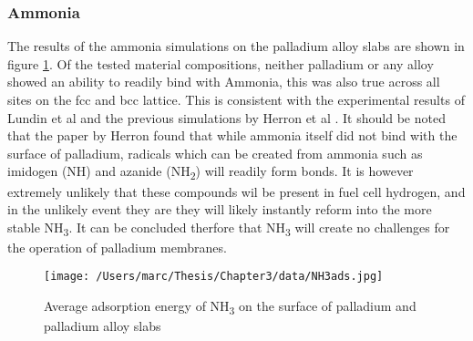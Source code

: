 \subsubsection{Ammonia}
The results of the ammonia simulations on the palladium alloy slabs are shown in figure \ref{nh3ads}. Of the tested material compositions, neither palladium or any alloy showed an ability to readily bind with Ammonia, this was also true across all sites on the fcc and bcc lattice. This is consistent with the experimental results of Lundin et al \cite{Lundin2016} and the previous simulations by Herron et al \cite{HERRON20121670}. It should be noted that the paper by Herron \cite{HERRON20121670} found that while ammonia itself did not bind with the surface of palladium, radicals which can be created from ammonia such as imidogen (NH) and azanide (NH\textsubscript{2}) will readily form bonds. It is however extremely unlikely that these compounds wil be present in fuel cell hydrogen, and in the unlikely event they are they will likely instantly reform into the more stable NH\textsubscript{3}. It can be concluded therfore that NH\textsubscript{3} will create no challenges for the operation of palladium membranes. 

  \begin{figure}
      \centering
      \texttt{[image: /Users/marc/Thesis/Chapter3/data/NH3ads.jpg]}
      \caption{Average adsorption energy of NH\textsubscript{3} on the surface of palladium and palladium alloy slabs}
      \label{nh3ads}
    \end{figure}
  

